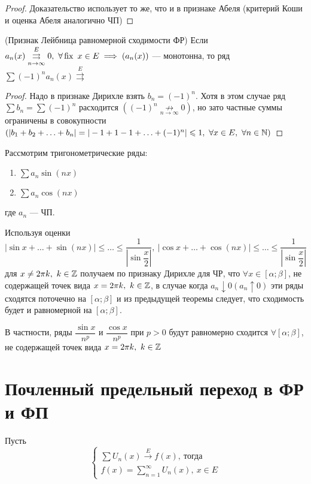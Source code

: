 \documentclass[../../main.tex]{subfiles}
\begin{document}
\begin{proof}
Доказательство использует то же, что и в признаке Абеля (критерий Коши и 
оценка Абеля аналогично ЧП)
\end{proof}

\begin{crl*} (Признак Лейбница равномерной сходимости ФР)
Если $a_n(x) \overset{E}
{\underset{n \to \infty}\rightrightarrows} 0,\ \forall \operatorname{fix} \ x \in E \implies
(a_n(x))$ --- монотонна, то ряд $\sum (-1)^n a_n(x) \overset{E}
{\rightrightarrows}$ 	
\end{crl*}

\begin{proof}
Надо в признаке Дирихле взять $b_n=(-1)^n$. Хотя в этом случае ряд 
$\sum b_n = \sum (-1)^n$ расходится $((-1)^n 
\underset{n \to \infty}{\not \longrightarrow} 0)$, но зато частные суммы
ограничены в совокупности $(|b_1 + b_2 + \ldots + b_n| = 
|-1+1-1+ \ldots + (-1)^n| \leqslant 1,\ \forall x \in E,\ \forall n \in \mathbb{N})$
\end{proof}	

\begin{exmps}
Рассмотрим тригонометрические ряды: 
	\begin{enumerate}
		\item $\sum a_n \sin(nx)$
		\item $\sum a_n \cos(nx)$
	\end{enumerate}
где $a_n$ --- ЧП.

Используя оценки $|\sin x + \ldots + \sin(nx)| 
\leq \ldots \leq \dfrac{1}{|\sin\dfrac{x}{2}|},\
|\cos x + \ldots + \cos(nx)| 
\leq \ldots \leq \dfrac{1}{|\sin\dfrac{x}{2}|}$
для $x \neq 2\pi k,\ k \in \mathbb{Z}$ получаем по признаку Дирихле для ЧР, что
$\forall x \in [\alpha; \beta]$, не содержащей точек вида 
$x = 2\pi k,\ k \in \mathbb{Z}$, в случае когда $a_n \downarrow 0 (a_n \uparrow 0)$ 
эти ряды сходятся поточечно на $[\alpha; \beta]$ и 
из предыдущей теоремы следует, что сходимость будет и равномерной
на $[\alpha; \beta]$.

В частности, ряды $\dfrac{\sin x}{n^p}$ и $\dfrac{\cos x}{n^p}$ при
$p > 0$ будут равномерно сходится $\forall [\alpha; \beta]$, не содержащей
точек вида $x = 2\pi k,\ k \in \mathbb{Z}$ 
\end{exmps}

\section{Почленный предельный переход в ФР и ФП}
Пусть 
\begin{equation}
\label{lec2:15}
\begin{cases}
\sum U_n(x) \overset{E}{\longrightarrow} f(x),\ \text{тогда} \\
f(x) = \sum\limits_{n = 1}^{\infty} U_n(x),\ x \in E
\end{cases}
\end{equation}
\end{document}
